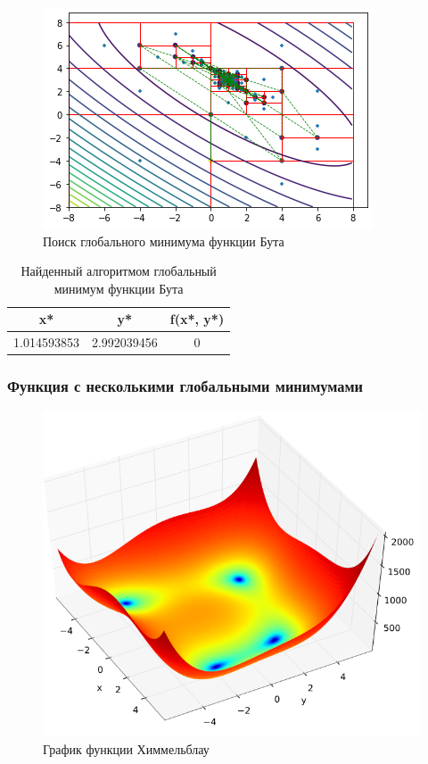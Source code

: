 \begin{figure}[H]
	\centering
		\includegraphics{task2/resources/Figure_2.png}
	\caption{Поиск глобального минимума функции Бута}
	\label{w_pert}
\end{figure}

\begin{table}[H]
	\centering
	\begin{tabular}{| c | c | c |}
		\hline
		    x* & y* & f(x*, y*) \\
		\hline
		    1.014593853 & 2.992039456 & 0 \\
   		\hline
	\end{tabular}
	\caption{Найденный алгоритмом глобальный минимум функции Бута}
\end{table}

\newpage
\subsubsection{Функция с несколькими глобальными минимумами}

\begin{figure}[H]
		\centering
			\includegraphics[scale=0.5]{task2/resources/Figure_3.png}
		\caption{График функции Химмельблау}
		\label{w_pert}
	\end{figure}

